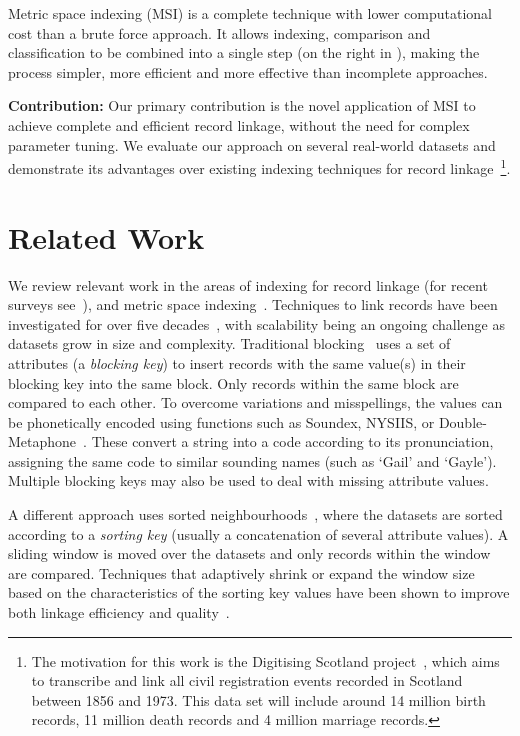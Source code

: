 \documentclass{llncs}
\begin{document}
Metric space indexing (MSI) is a complete technique with
lower computational cost than a brute force approach. It allows
indexing, comparison and classification to be combined into a single
step (on the right in
), making the process
simpler, more efficient and more effective than incomplete
approaches.

\textbf{Contribution:} Our primary contribution is the
novel application of MSI to achieve complete and efficient record
linkage, without the need for complex parameter tuning. We evaluate our
approach on several real-world datasets and
demonstrate its advantages over existing indexing techniques for
record linkage~\footnote{The motivation for this work is the Digitising Scotland
project~\cite{Dibben2012}, which aims to transcribe and
link all civil registration events recorded in Scotland between
1856 and 1973. This data set will include around 14
million birth records, 11 million death records and 4 million marriage
records.}.

\section{Related Work}
\label{sec-related}

We review relevant work in the areas of indexing for record
linkage (for recent surveys see~\cite{Chr12b,Pap16}), and metric space
indexing~\cite{Zezula2010}. Techniques to link records have been investigated for
over five decades~\cite{Fel69,New59}, with scalability
being an ongoing challenge as datasets grow in size and complexity.
Traditional blocking~\cite{Chr12b} uses a set of attributes (a
\emph{blocking key}) to insert records with the same value(s) in
their blocking key into the same block. Only records within the same
block are  compared to each other. To overcome variations and
misspellings, the values can be phonetically
encoded using functions such as Soundex, NYSIIS, or
Double-Metaphone~\cite{Chr12}. These convert a string into a code
according to its pronunciation, assigning the same code to similar
sounding names (such as `Gail' and `Gayle'). Multiple blocking keys
may also be used to deal with missing attribute values.

A different approach uses sorted neighbourhoods~\cite{Mon96}, where the datasets are sorted
according to a \emph{sorting key} (usually a concatenation of several attribute values). A sliding window is moved over the
datasets and only records within the window are compared. Techniques
that adaptively shrink or expand the window size based on the
characteristics of the sorting key values have been shown to improve
both linkage efficiency and quality~\cite{Dra12}.
\end{document}

